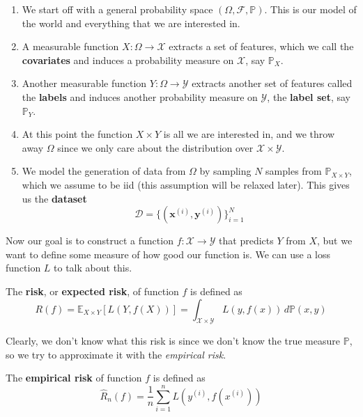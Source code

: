 \documentclass{article}
\begin{document}
    \begin{enumerate}
      \item We start off with a general probability space $(\Omega, \mathcal{F}, \mathbb{P})$. This is our model of the world and everything that we are interested in. 

      \item A measurable function $X: \Omega \rightarrow \mathcal{X}$ extracts a set of features, which we call the \textbf{covariates} and induces a probability measure on $\mathcal{X}$, say $\mathbb{P}_X$. 

      \item Another measurable function $Y: \Omega \rightarrow \mathcal{Y}$ extracts another set of features called the \textbf{labels} and induces another probability measure on $\mathcal{Y}$, the \textbf{label set}, say $\mathbb{P}_Y$. 

      \item At this point the function $X \times Y$ is all we are interested in, and we throw away $\Omega$ since we only care about the distribution over $\mathcal{X} \times \mathcal{Y}$. 

      \item We model the generation of data from $\Omega$ by sampling $N$ samples from $\mathbb{P}_{X \times Y}$, which we assume to be iid (this assumption will be relaxed later). This gives us the \textbf{dataset} 
        \[\mathcal{D} = \{(\mathbf{x}^{(i)}, \mathbf{y}^{(i)}) \}_{i=1}^N\]
    \end{enumerate}

    Now our goal is to construct a function $f: \mathcal{X} \rightarrow \mathcal{Y}$ that predicts $Y$ from $X$, but we want to define some measure of how good our function is. We can use a loss function $L$ to talk about this. 

    \begin{definition}[Risk]
      The \textbf{risk}, or \textbf{expected risk}, of function $f$ is defined as 
      \begin{equation}
        R(f) = \mathbb{E}_{X \times Y} [ L(Y, f(X))] = \int_{\mathcal{X} \times \mathcal{Y}} L(y, f(x)) \,d\mathbb{P}(x, y)
      \end{equation}
    \end{definition}

    Clearly, we don't know what this risk is since we don't know the true measure $\mathbb{P}$, so we try to approximate it with the \textit{empirical risk}. 

    \begin{definition}
      The \textbf{empirical risk} of function $f$ is defined as 
      \begin{equation}
        \hat{R}_n(f) = \frac{1}{n} \sum_{i=1}^n L(y^{(i)}, f(x^{(i)}))
      \end{equation}
    \end{definition}
\end{document}
